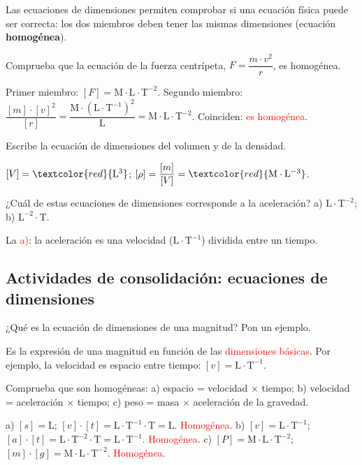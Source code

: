 Las ecuaciones de dimensiones permiten comprobar si una ecuación física puede ser correcta: los dos miembros deben tener las mismas dimensiones (ecuación \textbf{homogénea}).

\begin{example}
    Comprueba que la ecuación de la fuerza centrípeta, \(F = \dfrac{m \cdot v^2}{r}\), es homogénea.

    Primer miembro: \([F] = \mathrm{M \cdot L \cdot T^{-2}}\). Segundo miembro: \(\dfrac{[m] \cdot [v]^2}{[r]} = \dfrac{\mathrm{M} \cdot (\mathrm{L \cdot T^{-1}})^2}{\mathrm{L}} = \mathrm{M \cdot L \cdot T^{-2}}\). Coinciden: \textcolor{red}{es homogénea}.
\end{example}

\begin{exercise}
    Escribe la ecuación de dimensiones del volumen y de la densidad.
    \begin{solu}
        \([V] = \textcolor{red}{\mathrm{L^3}}\); \([\rho] = \dfrac{[m]}{[V]} = \textcolor{red}{\mathrm{M \cdot L^{-3}}}\).
    \end{solu}
\end{exercise}

\begin{exercise}
    ¿Cuál de estas ecuaciones de dimensiones corresponde a la aceleración? a) \(\mathrm{L \cdot T^{-2}}\); b) \(\mathrm{L^{-2} \cdot T}\).
    \begin{solu}
        La \textcolor{red}{a)}: la aceleración es una velocidad (\(\mathrm{L \cdot T^{-1}}\)) dividida entre un tiempo.
    \end{solu}
\end{exercise}

\subsection*{Actividades de consolidación: ecuaciones de dimensiones}

\begin{exercise}
    ¿Qué es la ecuación de dimensiones de una magnitud? Pon un ejemplo.
    \begin{solu}
        Es la expresión de una magnitud en función de las \textcolor{red}{dimensiones básicas}. Por ejemplo, la velocidad es espacio entre tiempo: \([v] = \mathrm{L \cdot T^{-1}}\).
    \end{solu}
\end{exercise}

\begin{exercise}
    Comprueba que son homogéneas: a) espacio = velocidad \(\times\) tiempo; b) velocidad = aceleración \(\times\) tiempo; c) peso = masa \(\times\) aceleración de la gravedad.
    \begin{solu}
        a) \([s] = \mathrm{L}\); \([v] \cdot [t] = \mathrm{L \cdot T^{-1} \cdot T} = \mathrm{L}\). \textcolor{red}{Homogénea}.
        b) \([v] = \mathrm{L \cdot T^{-1}}\); \([a] \cdot [t] = \mathrm{L \cdot T^{-2} \cdot T} = \mathrm{L \cdot T^{-1}}\). \textcolor{red}{Homogénea}.
        c) \([P] = \mathrm{M \cdot L \cdot T^{-2}}\); \([m] \cdot [g] = \mathrm{M \cdot L \cdot T^{-2}}\). \textcolor{red}{Homogénea}.
    \end{solu}
\end{exercise}

